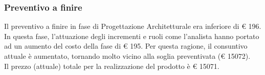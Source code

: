 \subsubsection{Preventivo a finire}
Il preventivo a finire in fase di Progettazione Architetturale era inferiore di \euro{} 196. In questa fase, l'attuazione degli incrementi e ruoli come l'analista hanno portato ad un aumento del costo della fase di \euro{} 195. Per questa ragione, il consuntivo attuale è aumentato, tornando molto vicino alla soglia preventivata (\euro{} 15072).\\
Il prezzo (attuale) totale per la realizzazione del prodotto è \euro{} 15071.